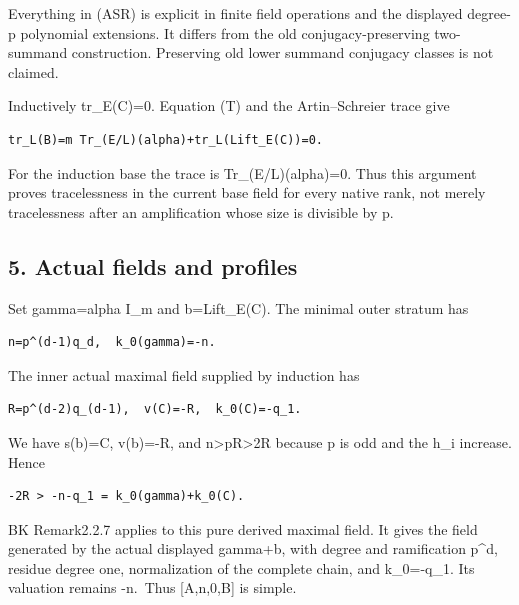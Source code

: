 Everything in (ASR) is explicit in finite field operations and the
displayed degree-p polynomial extensions. It differs from the old
conjugacy-preserving two-summand construction. Preserving old lower
summand conjugacy classes is not claimed.

Inductively tr\_E(C)=0. Equation (T) and the Artin--Schreier trace give

\begin{Verbatim}[fontsize=\small,breaklines=true,breakanywhere=true]
tr_L(B)=m Tr_(E/L)(alpha)+tr_L(Lift_E(C))=0.
\end{Verbatim}

For the induction base the trace is Tr\_(E/L)(alpha)=0. Thus this
argument proves tracelessness in the current base field for every native
rank, not merely tracelessness after an amplification whose size is
divisible by p.

\hypertarget{odd_tower-actual-fields-and-profiles}{%
\subsection{5. Actual fields and
profiles}\label{odd_tower-actual-fields-and-profiles}}

Set gamma=alpha I\_m and b=Lift\_E(C). The minimal outer stratum has

\begin{Verbatim}[fontsize=\small,breaklines=true,breakanywhere=true]
n=p^(d-1)q_d,  k_0(gamma)=-n.
\end{Verbatim}

The inner actual maximal field supplied by induction has

\begin{Verbatim}[fontsize=\small,breaklines=true,breakanywhere=true]
R=p^(d-2)q_(d-1),  v(C)=-R,  k_0(C)=-q_1.
\end{Verbatim}

We have s(b)=C, v(b)=-R, and n\textgreater pR\textgreater2R because p is
odd and the h\_i increase. Hence

\begin{Verbatim}[fontsize=\small,breaklines=true,breakanywhere=true]
-2R > -n-q_1 = k_0(gamma)+k_0(C).
\end{Verbatim}

BK Remark2.2.7 applies to this pure derived maximal field. It gives the
field generated by the actual displayed gamma+b, with degree and
ramification p\^{}d, residue degree one, normalization of the complete
chain, and k\_0=-q\_1. Its valuation remains -n.~Thus {[}A,n,0,B{]} is
simple.


